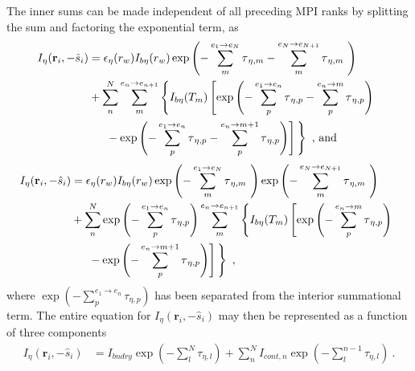 The inner sums can be made independent of all preceding MPI ranks by splitting the sum and factoring the exponential term, as
\begin{equation}
    \begin{aligned}
    I_\eta{}(\textbf{r}_i,-\hat{s}_i)& = 
    \epsilon{}_\eta{}(r_w)I_{b\eta{}}(r_w)\exp{\left(-\sum_{m}^{e_1\rightarrow{}e_{N}}\tau{}_{\eta{},m}-\sum_{m}^{e_N\rightarrow{}e_{N+1}}\tau{}_{\eta{},m}~\right)}\\
    &+\sum_{n}^{N}\sum_{m}^{e_n\rightarrow{}e_{n+1}}\left\{ I_{b\eta}(T_m)\left[ \exp{\left(-\sum_{p}^{e_1\rightarrow{}e_n}\tau{}_{\eta{},p}-\sum_{p}^{e_n\rightarrow{}m}\tau{}_{\eta,p}\right)}\right.{} \right.{} \\
    &\quad \left.{}\left.{} -\exp{\left(-\sum_{p}^{e_1\rightarrow{}e_n}\tau{}_{\eta{},p}-\sum_{p}^{e_n\rightarrow{}m+1}\tau{}_{\eta{},p}\right)} \vphantom{\frac12}\right] \vphantom{\frac12}\right\}~\text{, and}
    \end{aligned}
\end{equation}
\begin{equation}
    \begin{aligned}
    I_\eta{}(\textbf{r}_i,-\hat{s}_i)& = 
    \epsilon{}_\eta{}(r_w)I_{b\eta{}}(r_w)\exp{\left(-
\sum_{m}^{e_1\rightarrow{}e_{N}}\tau{}_{\eta{},m}~\right)}\exp{\left(-\sum_{m}^{e_N\rightarrow{}e_{N+1}}\tau{}_{\eta{},m}~\right)}\\
    &+\sum_{n}^{N}\exp\left(-\sum_{p}^{e_1\rightarrow{}e_n}\tau{}_{\eta{},p}\right)\sum_{m}^{e_n\rightarrow{}e_{n+1}}\left\{ I_{b\eta}(T_m)\left[ \exp{\left(-\sum_{p}^{e_n\rightarrow{}m}\tau{}_{\eta,p}\right)}\right.{} \right.{} \\
    &\quad \left.{}\left.{} -\exp{\left(-\sum_{p}^{e_n\rightarrow{}m+1}\tau{}_{\eta{},p}\right)} \vphantom{\frac12}\right] \vphantom{\frac12}\right\}~,
    \end{aligned}
\end{equation}
where $\exp\left(-\sum_{p}^{e_1\rightarrow{}e_n}\tau{}_{\eta{},p}\right)$ has been separated from the interior summational term. The entire equation for $I_\eta{}(\textbf{r}_i,-\hat{s}_i)$ may then be represented as a function of three components
\begin{equation}
    \begin{aligned}
    I_\eta{}(\textbf{r}_i,-\hat{s}_i)& = 
    I_{bndry}\exp\left(-\sum_l^{N}\tau{}_{\eta{},l}\right)+\sum_{n}^{N}I_{cont,n}\exp\left(-\sum_l^{n-1}\tau{}_{\eta{},l}\right)~.
    \end{aligned}
    \label{eq:NewRMCRTintensity}
\end{equation}

